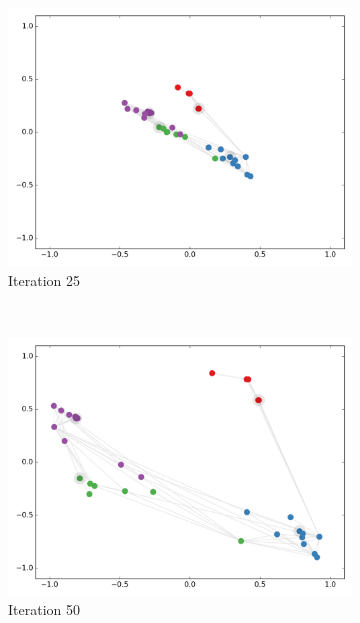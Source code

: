 \documentclass{article} %
\begin{document}
\begin{figure}[htbp]
\centering
\begin{subfigure}[b]{0.5\textwidth}
    \centering
    \includegraphics[width=\textwidth, trim={0 1.5cm 0 0}, clip]{anim_lines-25.png}
    \caption{Iteration 25}
    \label{fig:semi-emb-a}
\end{subfigure}%
~
\begin{subfigure}[b]{0.5\textwidth}
    \centering
    \includegraphics[width=\textwidth, trim={0 1.5cm 0 0}, clip]{anim_lines-50.png}
    \caption{Iteration 50}
    \label{fig:semi-emb-b}
\end{subfigure}%
\vspace{0.5em}
\begin{subfigure}[b]{0.5\textwidth}

\end{subfigure}
\end{figure}
\end{document}
